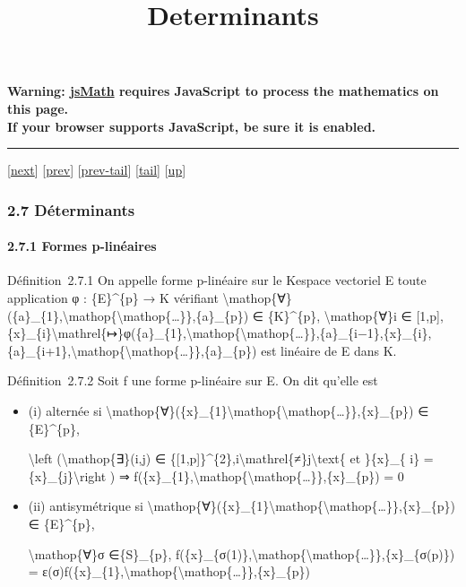 \documentclass[]{article}
\title{Determinants}
\author{}
\date{}
\begin{document}
\maketitle

\textbf{Warning: \href{http://www.math.union.edu/locate/jsMath}{jsMath}
requires JavaScript to process the mathematics on this page.\\ If your
browser supports JavaScript, be sure it is enabled.}

\begin{center}\rule{3in}{0.4pt}\end{center}

{[}\href{coursse14.html}{next}{]} {[}\href{coursse12.html}{prev}{]}
{[}\href{coursse12.html\#tailcoursse12.html}{prev-tail}{]}
{[}\hyperref[tailcoursse13.html]{tail}{]}
{[}\href{coursch3.html\#coursse13.html}{up}{]}

\subsubsection{2.7 Déterminants}

\paragraph{2.7.1 Formes p-linéaires}

Définition~2.7.1 On appelle forme p-linéaire sur le Kespace vectoriel E
toute application φ : \{E\}\^{}\{p\} → K vérifiant
\textbackslash{}mathop\{∀\}(\{a\}\_\{1\},\textbackslash{}mathop\{\textbackslash{}mathop\{\ldots{}\}\},\{a\}\_\{p\})
∈ \{K\}\^{}\{p\}, \textbackslash{}mathop\{∀\}i ∈ {[}1,p{]},
\{x\}\_\{i\}\textbackslash{}mathrel\{↦\}φ(\{a\}\_\{1\},\textbackslash{}mathop\{\textbackslash{}mathop\{\ldots{}\}\},\{a\}\_\{i−1\},\{x\}\_\{i\},\{a\}\_\{i+1\},\textbackslash{}mathop\{\textbackslash{}mathop\{\ldots{}\}\},\{a\}\_\{p\})
est linéaire de E dans K.

Définition~2.7.2 Soit f une forme p-linéaire sur E. On dit qu'elle est

\begin{itemize}
\item
  (i) alternée si
  \textbackslash{}mathop\{∀\}(\{x\}\_\{1\}\textbackslash{}mathop\{\textbackslash{}mathop\{\ldots{}\}\},\{x\}\_\{p\})
  ∈ \{E\}\^{}\{p\},

  \textbackslash{}left (\textbackslash{}mathop\{∃\}(i,j) ∈
  \{{[}1,p{]}\}\^{}\{2\},i\textbackslash{}mathrel\{≠\}j\textbackslash{}text\{
  et \}\{x\}\_\{ i\} = \{x\}\_\{j\}\textbackslash{}right ) ⇒
  f(\{x\}\_\{1\},\textbackslash{}mathop\{\textbackslash{}mathop\{\ldots{}\}\},\{x\}\_\{p\})
  = 0
\item
  (ii) antisymétrique si
  \textbackslash{}mathop\{∀\}(\{x\}\_\{1\}\textbackslash{}mathop\{\textbackslash{}mathop\{\ldots{}\}\},\{x\}\_\{p\})
  ∈ \{E\}\^{}\{p\},

  \textbackslash{}mathop\{∀\}σ ∈\{S\}\_\{p\},
  f(\{x\}\_\{σ(1)\},\textbackslash{}mathop\{\textbackslash{}mathop\{\ldots{}\}\},\{x\}\_\{σ(p)\})
  =
  ε(σ)f(\{x\}\_\{1\},\textbackslash{}mathop\{\textbackslash{}mathop\{\ldots{}\}\},\{x\}\_\{p\})
\end{itemize}
\end{document}
